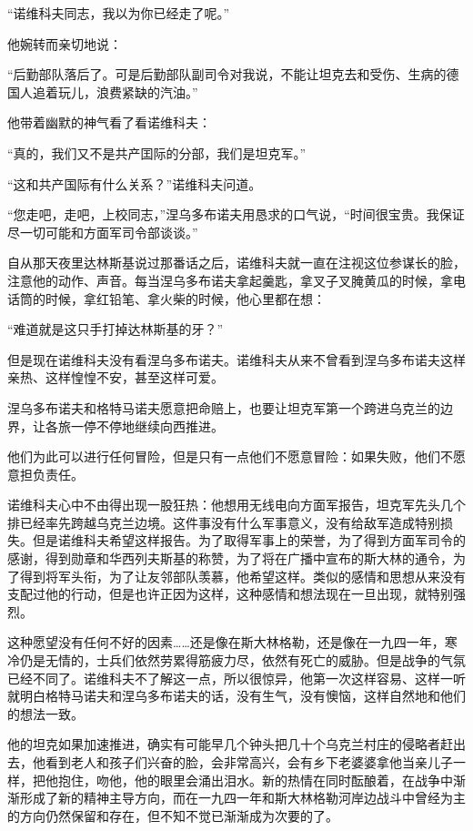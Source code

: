 “诺维科夫同志，我以为你已经走了呢。”

他婉转而亲切地说：

“后勤部队落后了。可是后勤部队副司令对我说，不能让坦克去和受伤、生病的德国人追着玩儿，浪费紧缺的汽油。”

他带着幽默的神气看了看诺维科夫：

“真的，我们又不是共产囯际的分部，我们是坦克军。”

“这和共产国际有什么关系？”诺维科夫问道。

“您走吧，走吧，上校同志，”涅乌多布诺夫用恳求的口气说，“时间很宝贵。我保证尽一切可能和方面军司令部谈谈。”

自从那天夜里达林斯基说过那番话之后，诺维科夫就一直在注视这位参谋长的脸，注意他的动作、声音。每当涅乌多布诺夫拿起羹匙，拿叉子叉腌黄瓜的时候，拿电话筒的时候，拿红铅笔、拿火柴的时候，他心里都在想：

“难道就是这只手打掉达林斯基的牙？”

但是现在诺维科夫没有看涅乌多布诺夫。诺维科夫从来不曾看到涅乌多布诺夫这样亲热、这样惶惶不安，甚至这样可爱。

涅乌多布诺夫和格特马诺夫愿意把命赔上，也要让坦克军第一个跨进乌克兰的边界，让各旅一停不停地继续向西推进。

他们为此可以进行任何冒险，但是只有一点他们不愿意冒险：如果失败，他们不愿意担负责任。

诺维科夫心中不由得出现一股狂热：他想用无线电向方面军报告，坦克军先头几个排已经率先跨越乌克兰边境。这件事没有什么军事意义，没有给敌军造成特别损失。但是诺维科夫希望这样报告。为了取得军事上的荣誉，为了得到方面军司令的感谢，得到勋章和华西列夫斯基的称赞，为了将在广播中宣布的斯大林的通令，为了得到将军头衔，为了让友邻部队羡慕，他希望这样。类似的感情和思想从来没有支配过他的行动，但是也许正因为这样，这种感情和想法现在一旦出现，就特别强烈。

这种愿望没有任何不好的因素……还是像在斯大林格勒，还是像在一九四一年，寒冷仍是无情的，士兵们依然劳累得筋疲力尽，依然有死亡的威胁。但是战争的气氛已经不同了。诺维科夫不了解这一点，所以很惊异，他第一次这样容易、这样一听就明白格特马诺夫和涅乌多布诺夫的话，没有生气，没有懊恼，这样自然地和他们的想法一致。

他的坦克如果加速推进，确实有可能早几个钟头把几十个乌克兰村庄的侵略者赶出去，他看到老人和孩子们兴奋的脸，会非常高兴，会有乡下老婆婆拿他当亲儿子一样，把他抱住，吻他，他的眼里会涌出泪水。新的热情在同时酝酿着，在战争中渐渐形成了新的精神主导方向，而在一九四一年和斯大林格勒河岸边战斗中曾经为主的方向仍然保留和存在，但不知不觉已渐渐成为次要的了。

